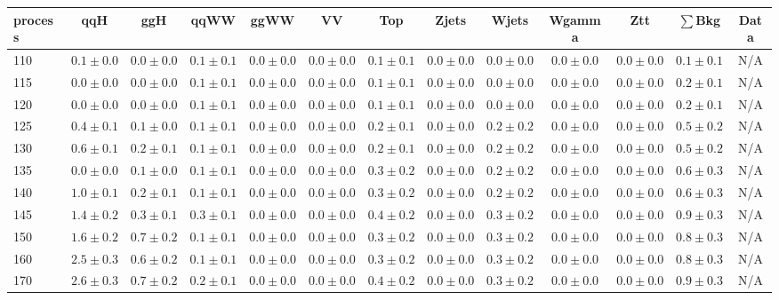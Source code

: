 \begin{table}
{%
 \tiny
 \begin{center}
 \begin{tabular}{l | c c | c c c c c c c c  | c c}
 \hline
 process & qqH & ggH & qqWW & ggWW & VV & Top & Zjets & Wjets & Wgamma & Ztt & $\sum$Bkg & Data \\
 \hline
110 & $0.1\pm0.0$ & $0.0\pm0.0$ & $0.1\pm0.1$ & $0.0\pm0.0$ & $0.0\pm0.0$ & $0.1\pm0.1$ & $0.0\pm0.0$ & $0.0\pm0.0$ & $0.0\pm0.0$ & $0.0\pm0.0$ & $0.1\pm0.1$ & N/A \\
115 & $0.0\pm0.0$ & $0.0\pm0.0$ & $0.1\pm0.1$ & $0.0\pm0.0$ & $0.0\pm0.0$ & $0.1\pm0.1$ & $0.0\pm0.0$ & $0.0\pm0.0$ & $0.0\pm0.0$ & $0.0\pm0.0$ & $0.2\pm0.1$ & N/A \\
120 & $0.0\pm0.0$ & $0.0\pm0.0$ & $0.1\pm0.1$ & $0.0\pm0.0$ & $0.0\pm0.0$ & $0.1\pm0.1$ & $0.0\pm0.0$ & $0.0\pm0.0$ & $0.0\pm0.0$ & $0.0\pm0.0$ & $0.2\pm0.1$ & N/A \\
125 & $0.4\pm0.1$ & $0.1\pm0.0$ & $0.1\pm0.1$ & $0.0\pm0.0$ & $0.0\pm0.0$ & $0.2\pm0.1$ & $0.0\pm0.0$ & $0.2\pm0.2$ & $0.0\pm0.0$ & $0.0\pm0.0$ & $0.5\pm0.2$ & N/A \\
130 & $0.6\pm0.1$ & $0.2\pm0.1$ & $0.1\pm0.1$ & $0.0\pm0.0$ & $0.0\pm0.0$ & $0.2\pm0.1$ & $0.0\pm0.0$ & $0.2\pm0.2$ & $0.0\pm0.0$ & $0.0\pm0.0$ & $0.5\pm0.2$ & N/A \\
135 & $0.0\pm0.0$ & $0.1\pm0.0$ & $0.1\pm0.1$ & $0.0\pm0.0$ & $0.0\pm0.0$ & $0.3\pm0.2$ & $0.0\pm0.0$ & $0.2\pm0.2$ & $0.0\pm0.0$ & $0.0\pm0.0$ & $0.6\pm0.3$ & N/A \\
140 & $1.0\pm0.1$ & $0.2\pm0.1$ & $0.1\pm0.1$ & $0.0\pm0.0$ & $0.0\pm0.0$ & $0.3\pm0.2$ & $0.0\pm0.0$ & $0.2\pm0.2$ & $0.0\pm0.0$ & $0.0\pm0.0$ & $0.6\pm0.3$ & N/A \\
145 & $1.4\pm0.2$ & $0.3\pm0.1$ & $0.3\pm0.1$ & $0.0\pm0.0$ & $0.0\pm0.0$ & $0.4\pm0.2$ & $0.0\pm0.0$ & $0.3\pm0.2$ & $0.0\pm0.0$ & $0.0\pm0.0$ & $0.9\pm0.3$ & N/A \\
150 & $1.6\pm0.2$ & $0.7\pm0.2$ & $0.1\pm0.1$ & $0.0\pm0.0$ & $0.0\pm0.0$ & $0.3\pm0.2$ & $0.0\pm0.0$ & $0.3\pm0.2$ & $0.0\pm0.0$ & $0.0\pm0.0$ & $0.8\pm0.3$ & N/A \\
160 & $2.5\pm0.3$ & $0.6\pm0.2$ & $0.1\pm0.1$ & $0.0\pm0.0$ & $0.0\pm0.0$ & $0.3\pm0.2$ & $0.0\pm0.0$ & $0.3\pm0.2$ & $0.0\pm0.0$ & $0.0\pm0.0$ & $0.8\pm0.3$ & N/A \\
170 & $2.6\pm0.3$ & $0.7\pm0.2$ & $0.2\pm0.1$ & $0.0\pm0.0$ & $0.0\pm0.0$ & $0.4\pm0.2$ & $0.0\pm0.0$ & $0.3\pm0.2$ & $0.0\pm0.0$ & $0.0\pm0.0$ & $0.9\pm0.3$ & N/A \\

\end{tabular}
\end{center}}
\end{table}
